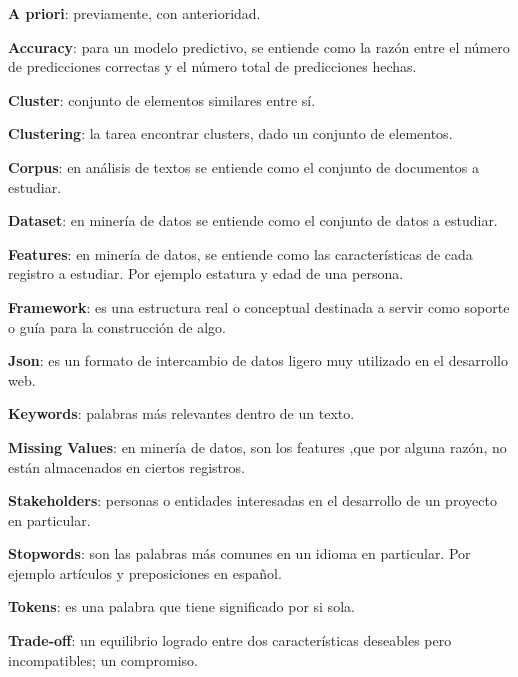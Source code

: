 
{\setlength{\parskip}{0cm} %
\textbf{A priori}: previamente, con anterioridad.

\textbf{Accuracy}: para un modelo predictivo, se entiende como la razón entre el número de predicciones correctas y el número total de predicciones hechas.

\textbf{Cluster}: conjunto de elementos similares entre sí.

\textbf{Clustering}: la tarea encontrar clusters, dado un conjunto de elementos.

\textbf{Corpus}: en análisis de textos se entiende como el conjunto de documentos a estudiar.

\textbf{Dataset}: en minería de datos se entiende como el conjunto de datos a estudiar. 

\textbf{Features}: en minería de datos, se entiende como las características de cada registro a estudiar. Por ejemplo estatura y edad de una persona.

\textbf{Framework}: es una estructura real o conceptual destinada a servir como soporte o guía para la construcción de algo.

\textbf{Json}: es un formato de intercambio de datos ligero muy utilizado en el desarrollo web.

\textbf{Keywords}: palabras más relevantes dentro de un texto.

\textbf{Missing Values}: en minería de datos, son los features ,que por alguna razón, no están almacenados en ciertos registros.

\textbf{Stakeholders}: personas o entidades interesadas en el desarrollo de un proyecto en particular.

\textbf{Stopwords}: son las palabras más comunes en un idioma en particular. Por ejemplo artículos y preposiciones en español.

\textbf{Tokens}: es una palabra que tiene significado por si sola.

\textbf{Trade-off}: un equilibrio logrado entre dos características deseables pero incompatibles; un compromiso.
}
